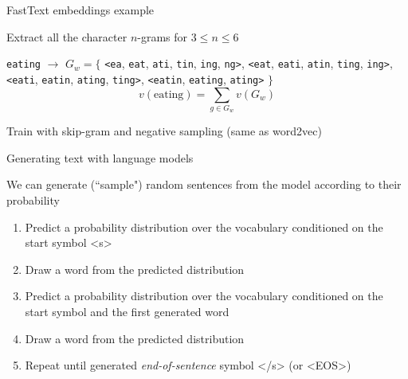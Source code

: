 \documentclass[12pt,aspectratio=169,handout]{beamer}
\begin{document}
\begin{frame}{FastText embeddings example}
	
Extract all the character $n$-grams for $3 \leq n \leq 6$

\begin{example}
\texttt{eating} $\to$ $G_w = \{$
\texttt{<ea}, \texttt{eat}, \texttt{ati}, \texttt{tin}, \texttt{ing}, \texttt{ng>},
\texttt{<eat}, \texttt{eati}, \texttt{atin}, \texttt{ting}, \texttt{ing>},
\texttt{<eati}, \texttt{eatin}, \texttt{ating}, \texttt{ting>},
\texttt{<eatin}, \texttt{eating}, \texttt{ating>} $\}$
$$
v(\text{eating}) = \sum_{g \in G_w} v(G_w)
$$
\end{example}

Train with skip-gram and negative sampling (same as word2vec)



\end{frame}

\begin{frame}{Generating text with language models}
	
	We can generate (``sample") random sentences from the model according to their probability
	
	\begin{enumerate}
		\item Predict a probability distribution over the vocabulary conditioned on the start symbol <s>
		\item Draw a word from the predicted distribution
		\item Predict a probability distribution over the vocabulary conditioned on the start symbol and the first generated word
		\item Draw a word from the predicted distribution
		\item Repeat until generated \emph{end-of-sentence} symbol </s> (or <EOS>)
	\end{enumerate}
	
	
\end{frame}

	
\end{document}

